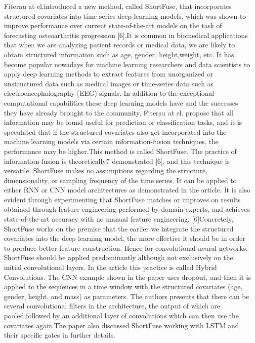 \documentclass[12pt]{article}
\begin{document}
Fiterau at el.introduced  a  new  method,  called  ShortFuse,  that  incorporates  structured covariates into time series deep learning models, which was shown to improve performance over current state-of-the-art models on the task of forecasting osteoarthritis progression [6].It is common in biomedical applications that when we are analyzing patient records or medical data,  we are likely to obtain structured information such as age,  gender,  height,weight, etc.  It has become popular nowadays for machine learning researchers and data scientists to apply deep learning methods to extract features from unorganized or unstructured data such as medical images or time-series data such as electroencephalography (EEG) signals.  In addition to the exceptional computational capabilities these deep learning models have and the successes they have already brought to the community, Fiterau at el. propose that  all  information  may  be  found  useful  for  prediction  or  classification  tasks,  and  it  is speculated that if the structured covariates also get incorporated into the machine learning models via certain information-fusion techniques, the performance may be higher.This  method  is  called  ShortFuse.   The  practice  of  information  fusion  is  theoretically7
demonstrated [6], and this technique is versatile.  ShortFuse makes no assumptions regarding the structure, dimensionality, or sampling frequency of the time series.  It can be applied to either RNN or CNN model architectures as demonstrated in the article.  It is also evident through  experimenting  that  ShortFuse  matches  or  improves  on  results  obtained  through feature  engineering  performed  by  domain  experts,  and  achieves  state-of-the-art  accuracy with no manual feature engineering.  [6]Concretely, ShortFuse works on the premise that the earlier we integrate the structured covariates into the deep learning model, the more effective it should be in order to produce better feature construction.  Hence for convolutional neural networks, ShortFuse should be applied predominantly although not exclusively on the initial convolutional layers.  In the article this practice is called Hybrid Convolutions.  The CNN example shown in the paper uses dropout, and then it is applied to the sequences in a time window with the structured covariates (age, gender, height, and mass) as parameters.  The authors presents that there can  be  several  convolutional  filters  in  the  architecture,  the  output  of  which  are  pooled,followed  by  an  additional  layer  of  convolutions  which  can  then  use  the  covariates  again.The paper also discussed ShortFuse working with LSTM and their specific gates in further details.
\end{document}
